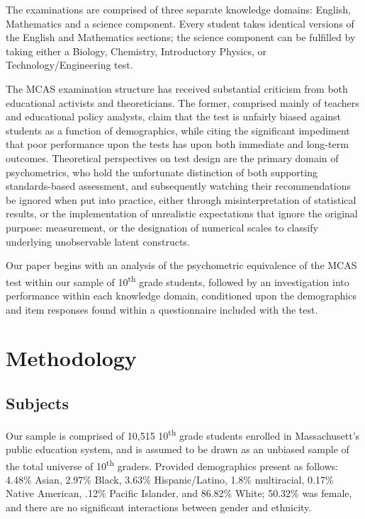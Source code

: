 \documentclass{article}\usepackage[]{graphicx}\usepackage[]{color}
\begin{document}
The examinations are comprised of three separate knowledge domains: English, Mathematics and a science component. Every student takes identical versions of the English and Mathematics sections; the science component can be fulfilled by taking either a Biology, Chemistry, Introductory Physics, or Technology/Engineering test. \cite{mcas_summary}

The MCAS examination structure has received substantial criticism from both educational activists and theoreticians. The former, comprised mainly of teachers and educational policy analysts, claim that the test is unfairly biased against students as a function of demographics, while citing the significant impediment that poor performance upon the tests has upon both immediate and long-term outcomes. \cite{Gaudet} Theoretical perspectives on test design are the primary domain of psychometrics, who hold the unfortunate distinction of both supporting standards-based assessment, and subsequently watching their recommendations be ignored when put into practice, either through misinterpretation of statistical results, or the implementation of unrealistic expectations that ignore the original purpose: measurement, or the designation of numerical scales to classify underlying unobservable latent constructs. 

Our paper begins with an analysis of the psychometric equivalence of the MCAS test within our sample of 10\textsuperscript{th} grade students, followed by an investigation into performance within each knowledge domain, conditioned upon the demographics and item responses found within a questionnaire included with the test.

\section{Methodology}
\subsection{Subjects}
Our sample is comprised of 10,515 10\textsuperscript{th} grade students enrolled in Massachusett's public education system, and is assumed to be drawn as an unbiased sample of the total universe of 10\textsuperscript{th} graders. Provided demographics present as follows: 4.48\% Asian, 2.97\% Black, 3.63\% Hispanic/Latino, 1.8\% multiracial, 0.17\% Native American, .12\% Pacific Islander, and 86.82\% White; 50.32\% was female, and there are no significant interactions between gender and ethnicity.
\end{document}
